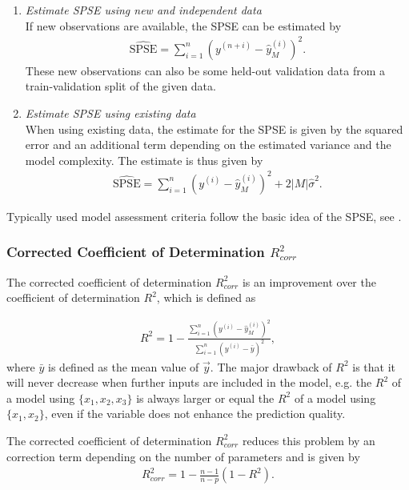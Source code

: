 \documentclass[10pt,a4paper]{report}
\begin{document}
\begin{enumerate}

	\item \emph{Estimate SPSE using new and independent data} \\	
	If new observations are available, the SPSE can be estimated by
	\begin{align}
		\widehat{\text{SPSE}} = \sum_{i=1}^n (y^{(n+i)} - \hat y^{(i)}_M)^2.
	\end{align}
	These new observations can also be some held-out validation data from a train-validation split of the given data. 
	
	\item \emph{Estimate SPSE using existing data} \\
	When using existing data, the estimate for the SPSE is given by the squared error and an additional  term depending on the estimated variance and the model complexity. The estimate is thus given by
	\begin{align}
		\widehat{\text{SPSE}} = \sum_{i=1}^n(y^{(i)} - \hat y^{(i)}_M)^2 + 2\vert M \vert \hat \sigma^2.
	\end{align}

\end{enumerate}

Typically used model assessment criteria follow the basic idea of the SPSE, see \cite{fahrmeir2007regression}.

\subsubsection{Corrected Coefficient of Determination $R_{corr}^2$}

The corrected coefficient of determination $R^2_{corr}$ is an improvement over the coefficient of determination $R^2$, which is defined as 

\begin{align}
	R^2 = 1 - \frac{\sum_{i=1}^n ( y^{(i)} - \hat y^{(i)}_M )^2}{\sum_{i=1}^n (y^{(i)} - \bar y)^2},
\end{align}
%
where $\bar y$ is defined as the mean value of $\vec{y}$. The major drawback of $R^2$ is that it will never decrease when further inputs are included in the model, e.g. the $R^2$ of a model using $\{x_1, x_2, x_3\}$ is always larger or equal the $R^2$ of a model using $\{x_1, x_2\}$, even if the variable does not enhance the prediction quality. 

The corrected coefficient of determination $R_{corr}^2$ reduces this problem by an correction term depending on the  number of parameters and is given by
\begin{align}
	R_{corr}^2 = 1 - \frac{n-1}{n-p}(1-R^2).
\end{align}
\end{document}
